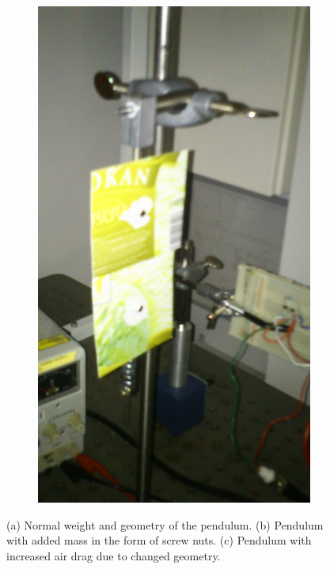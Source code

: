 \begin{figure}[htbp]
\begin{subfigure}{.3\textwidth}
	\includegraphics[width=\textwidth]{img/pendulumDraggy}
	\caption{}
	\label{fig:pendulumDraggy}
\end{subfigure}
\caption{(a) Normal weight and geometry of the  pendulum. (b) Pendulum with added mass in the form of screw nuts. (c) Pendulum with increased air drag due to changed geometry.}
\end{figure}